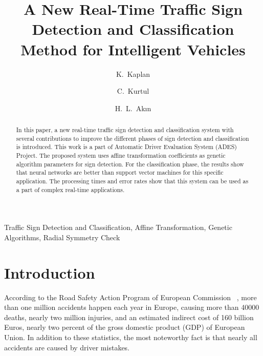 \documentclass[review,number]{elsarticle}
\begin{document}
\begin{frontmatter}

\title{A New Real-Time Traffic Sign Detection and Classification Method for Intelligent Vehicles}

\author[boun]{K.~Kaplan}
\author[boun]{C.~Kurtul}
\author[boun]{H.~L.~Ak{\i}n}
\address[boun]{Department of Computer Engineering, Bo{\u g}azi{\c c}i University,\\
34342, Bebek, \.{I}stanbul, Turkey.\\
Phone: +90 212 359 4523-24 \\
Fax: +90 212 287 2461}

\begin{abstract}
In this paper, a new real-time traffic sign detection and classification system with several contributions to improve the different phases of sign detection and classification is introduced. This work is a part of Automatic Driver Evaluation System (ADES) Project. The proposed system uses affine transformation coefficients as genetic algorithm parameters for sign detection. For the classification phase, the results show that neural networks are better than support vector machines for this specific application. The processing times and error rates show that this system can be used as a part of complex real-time applications. 
\end{abstract}

\begin{keyword}
Traffic Sign Detection and Classification, Affine Transformation, Genetic Algorithms, Radial Symmetry Check
\end{keyword}

\end{frontmatter}

\section{Introduction}
According to the Road Safety Action Program of European Commission ~\cite{signbib01}, more than one million accidents happen each year in Europe, causing more than 40000 deaths, nearly two million injuries, and an estimated indirect cost of 160 billion Euros, nearly two percent of the gross domestic product (GDP) of European Union. In addition to these statistics, the most noteworthy fact is that nearly all accidents are caused by driver mistakes.
\end{document}
